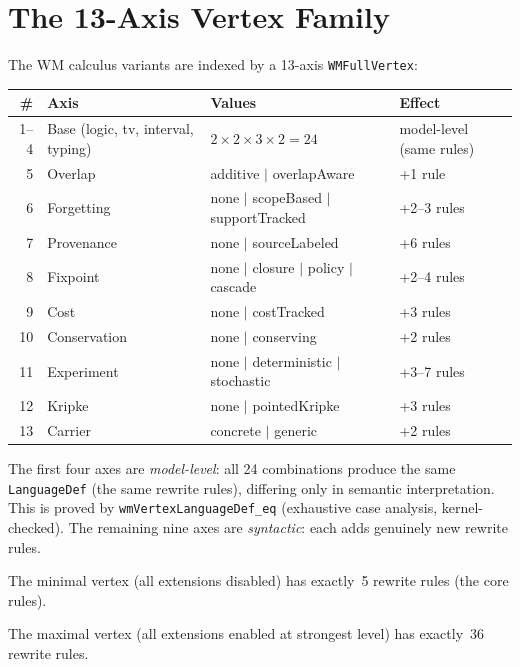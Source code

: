 \documentclass[11pt,openany]{report}
\begin{document}
\section{The 13-Axis Vertex Family}
\label{sec:wm-vertex-family}
\label{sec:wm-13axis}

The WM calculus variants are indexed by a 13-axis \texttt{WMFullVertex}:

\begin{center}
\begin{tabular}{rlll}
\toprule
\textbf{\#} & \textbf{Axis} & \textbf{Values} & \textbf{Effect} \\
\midrule
1--4 & Base (logic, tv, interval, typing)
     & $2 \times 2 \times 3 \times 2 = 24$
     & model-level (same rules) \\
5 & Overlap & additive $|$ overlapAware & +1 rule \\
6 & Forgetting & none $|$ scopeBased $|$ supportTracked & +2--3 rules \\
7 & Provenance & none $|$ sourceLabeled & +6 rules \\
8 & Fixpoint & none $|$ closure $|$ policy $|$ cascade & +2--4 rules \\
9 & Cost & none $|$ costTracked & +3 rules \\
10 & Conservation & none $|$ conserving & +2 rules \\
11 & Experiment & none $|$ deterministic $|$ stochastic & +3--7 rules \\
12 & Kripke & none $|$ pointedKripke & +3 rules \\
13 & Carrier & concrete $|$ generic & +2 rules \\
\bottomrule
\end{tabular}
\end{center}

The first four axes are \emph{model-level}: all 24 combinations produce the
same \texttt{LanguageDef} (the same rewrite rules), differing only in
semantic interpretation.  This is proved by \texttt{wmVertexLanguageDef\_eq}
(exhaustive case analysis, kernel-checked).  The remaining nine axes are
\emph{syntactic}: each adds genuinely new rewrite rules.

\begin{theorem}
The minimal vertex (all extensions disabled) has exactly~5 rewrite rules
(the core rules).
\end{theorem}

\begin{theorem}
The maximal vertex (all extensions enabled at strongest level) has exactly~36
rewrite rules.
\end{theorem}
\end{document}
